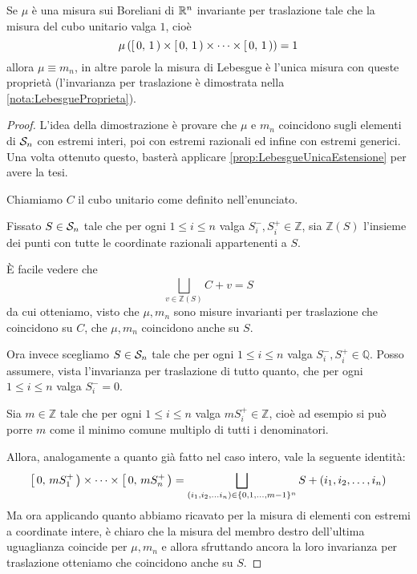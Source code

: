 \begin{theorem}\label{thm:LebesgueUnicaInvarianteTraslazione}
	Se $\mu$ è una misura sui Boreliani di $\R^n$ invariante per traslazione tale che la misura del cubo unitario valga $1$, cioè
	\begin{equation*}
		\mu\left(\co01\times\co01\times\cdots\times\co01\right)=1
	\end{equation*}
	allora $\mu\equiv m_n$, in altre parole la misura di Lebesgue è l'unica misura con queste proprietà (l'invarianza per traslazione è dimostrata nella \cref{nota:LebesgueProprieta}).
\end{theorem}
\begin{proof}
	L'idea della dimostrazione è provare che $\mu$ e $m_n$ coincidono sugli elementi di $\S_n$ con estremi interi, poi con estremi razionali ed infine con estremi generici.
	Una volta ottenuto questo, basterà applicare \cref{prop:LebesgueUnicaEstensione} per avere la tesi.
	
	Chiamiamo $C$ il cubo unitario come definito nell'enunciato.
	
	Fissato $S\in\S_n$ tale che per ogni $1\le i\le n$ valga $S^-_i,S^+_i\in \mathbb Z$, sia $\mathbb Z(S)$ l'insieme dei punti con tutte le coordinate razionali appartenenti a $S$.
	
	È facile vedere che
	\begin{equation*}
		\bigsqcup_{v\in\mathbb Z(S)} C+v=S
	\end{equation*}
	da cui otteniamo, visto che $\mu,m_n$ sono misure invarianti per traslazione che coincidono su $C$, che $\mu,m_n$ coincidono anche su $S$.
	
	Ora invece scegliamo $S\in\S_n$ tale che per ogni $1\le i\le n$ valga $S^-_i,S^+_i\in \mathbb Q$. Posso assumere, vista l'invarianza per traslazione di tutto quanto, che per ogni $1\le i\le n$ valga $S^-_i=0$.
	
	Sia $m\in\mathbb Z$ tale che per ogni $1\le i\le n$ valga $mS^+_i\in \mathbb Z$, cioè ad esempio si può porre $m$ come il minimo comune multiplo di tutti i denominatori.
	
	Allora, analogamente a quanto già fatto nel caso intero, vale la seguente identità:
	\begin{equation*}
		\co0{mS^+_1}\times\cdots\times\co0{mS^+_n}=
		\bigsqcup_{(i_1,i_2,\dots i_n)\in\mathbb \{0,1,\dots,m-1\}^n}S+(i_1,i_2,\dots,i_n)
	\end{equation*}
	Ma ora applicando quanto abbiamo ricavato per la misura di elementi con estremi a coordinate intere, è chiaro che la misura del membro destro dell'ultima uguaglianza coincide per $\mu,m_n$ e allora sfruttando ancora la loro invarianza per traslazione otteniamo che coincidono anche su $S$.
	

\end{proof}
